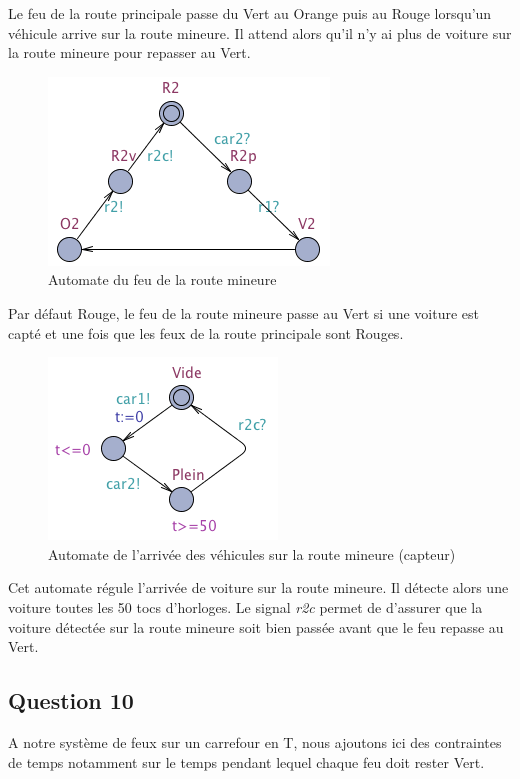\documentclass[11pt]{article}
\begin{document}
Le feu de la route principale passe du Vert au Orange puis au Rouge lorsqu'un véhicule arrive sur la route mineure. Il attend alors qu'il n'y ai plus de voiture sur la route mineure pour repasser au Vert.

\begin{figure}[H]
	\centering
	\includegraphics{ressources/part3/Q9-2.png}
	\caption{Automate du feu de la route mineure}
\end{figure}

Par défaut Rouge, le feu de la route mineure passe au Vert si une voiture est capté et une fois que les feux de la route principale sont Rouges.

\begin{figure}[H]
	\centering
	\includegraphics{ressources/part3/Q9-3.png}
	\caption{Automate de l'arrivée des véhicules sur la route mineure (capteur)}
\end{figure}

Cet automate régule l'arrivée de voiture sur la route mineure. Il détecte alors une voiture toutes les 50 tocs d'horloges. Le signal \emph{r2c} permet de d'assurer que la voiture détectée sur la route mineure soit bien passée avant que le feu repasse au Vert.

\subsection{Question 10}

A notre système de feux sur un carrefour en T, nous ajoutons ici des contraintes de temps notamment sur le temps pendant lequel chaque feu doit rester Vert.
\end{document}
